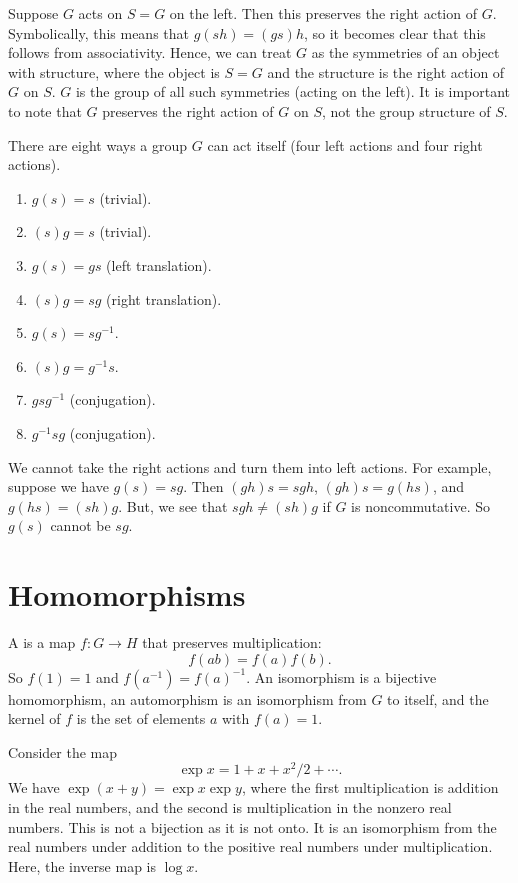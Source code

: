 \documentclass[11pt, twoside]{amsart}
\begin{document}
Suppose $G$ acts on $S=G$ on the left. Then this preserves the right action of $G$. Symbolically, this means that $g(sh) = (gs)h$, so it becomes clear that this follows from associativity. Hence, we can treat $G$ as the symmetries of an object with structure, where the object is $S=G$ and the structure is the right action of $G$ on $S$. $G$ is the group of all such symmetries (acting on the left). It is important to note that $G$ preserves the right action of $G$ on $S$, not the group structure of $S$.


There are eight ways a group $G$ can act itself (four left actions and four right actions). 
\begin{enumerate}
\item $g(s) = s$ (trivial).
\item $(s)g = s$ (trivial).
\item $g(s) = gs$ (left translation).
\item $(s)g = sg$ (right translation).
\item $g(s) = sg^{-1}$.
\item $(s)g = g^{-1}s$.
\item $gsg^{-1} $ (conjugation).
\item $g^{-1}sg$ (conjugation).
\end{enumerate}
We cannot take the right actions and turn them into left actions. For example, suppose we have $g(s) = sg$. Then $(gh)s = sgh$, $(gh)s = g(hs)$, and $g(hs) = (sh)g$. But, we see that $sgh\neq (sh)g$ if $G$ is noncommutative. So $g(s)$ cannot be $sg$.
\section{Homomorphisms}
A  is a map $f:G\longrightarrow H$ that preserves multiplication:
$$
f(ab) = f(a)f(b).
$$
So $f(1) = 1$ and $f(a^{-1}) = f(a)^{-1}$. An isomorphism is a bijective homomorphism, an automorphism is an isomorphism from $G$ to itself, and the kernel of $f$ is the set of elements $a$ with $f(a)=1$. 

Consider the map
$$
\exp x = 1 + x + {x^2}/{2}+\cdots.
$$
We have $\exp(x+y) = \exp x \exp y$, where the first multiplication is addition in the real numbers, and the second is multiplication in the nonzero real numbers. This is not a bijection as it is not onto. It is an isomorphism from the real numbers under addition to the positive real numbers under multiplication. Here, the inverse map is $\log x$.
\end{document}

